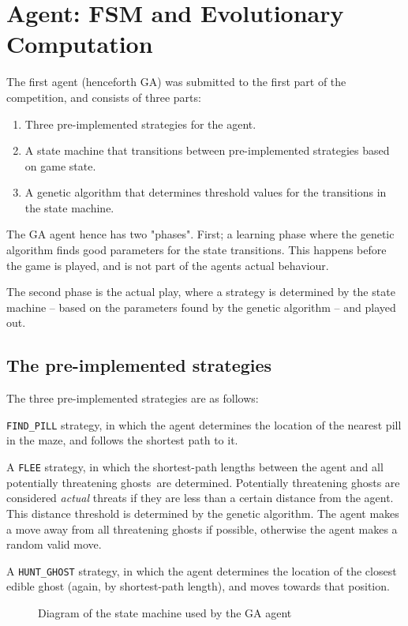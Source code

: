 \section{Agent: FSM and Evolutionary Computation}
\label{sec:GA}

The first agent (henceforth GA) was submitted to the first part of the competition, and consists of three parts:

\begin{enumerate}
\item Three pre-implemented strategies for the agent.
\item A state machine that transitions between pre-implemented strategies based
	on game state.
\item A genetic algorithm that determines threshold values for the transitions
	in the state machine.
\end{enumerate}

The GA agent hence has two "phases". First; a learning phase where the genetic
algorithm finds good parameters for the state transitions. This happens before
the game is played, and is not part of the agents actual behaviour.

The second phase is the actual play, where a strategy is determined by the state
machine -- based on the parameters found by the genetic algorithm -- and played out.
\subsection{The pre-implemented strategies}
The three pre-implemented strategies are as follows:

 \texttt{FIND\_PILL} strategy, in which the agent determines the location of the
nearest pill in the maze, and follows the shortest path to it.

A \texttt{FLEE} strategy, in which the shortest-path lengths between the agent
and all potentially threatening ghosts\footnotemark\ are determined.
Potentially threatening ghosts are considered \textit{actual} threats if they
are less than a certain distance from the agent. This distance threshold is
determined by the genetic algorithm. The agent makes a move away from all
threatening ghosts if possible, otherwise the agent makes a random valid move.

A \texttt{HUNT\_GHOST} strategy, in which the agent determines the location of
the closest edible ghost (again, by shortest-path length), and moves towards
that position.

\begin{figure}[hbtp]
	\framebox{
		
	}
\caption{Diagram of the state machine used by the GA agent}
\end{figure}

